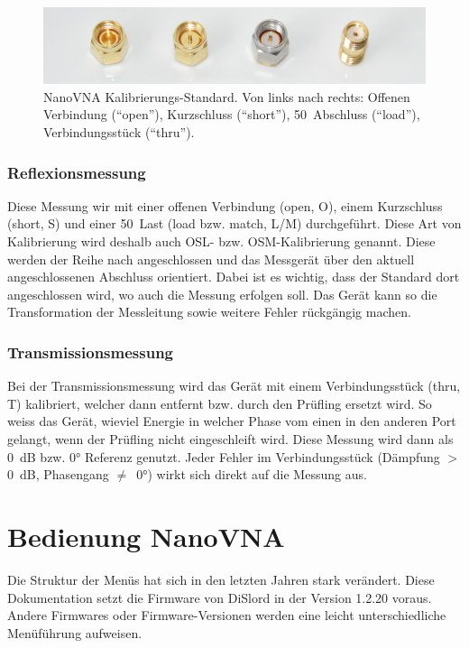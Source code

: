 \documentclass[twoside,a4paper,11pt,halfparskip,DIV=11,notitlepage]{scrartcl}
\begin{document}
\begin{figure}[t]
    \includegraphics[width=\textwidth]{figures/calkit.jpg}
    \caption{NanoVNA Kalibrierungs-Standard. Von links nach rechts:
        Offenen Verbindung (``open''), Kurzschluss (``short''),
    50~\Ohm Abschluss (``load''), Verbindungsstück (``thru'').}
    \label{fig:calkit}
\end{figure}

\subsubsection{Reflexionsmessung}
Diese Messung wir mit einer offenen Verbindung (open, O), einem Kurzschluss
(short, S) und einer 50~\Ohm Last (load bzw. match, L/M) durchgeführt. Diese Art von
Kalibrierung wird deshalb auch OSL- bzw. OSM-Kalibrierung genannt. Diese
werden der Reihe nach angeschlossen und das Messgerät über den aktuell angeschlossenen
Abschluss orientiert. Dabei ist es wichtig, dass der Standard dort angeschlossen
wird, wo auch die Messung erfolgen soll. Das Gerät kann so die Transformation
der Messleitung sowie weitere Fehler rückgängig machen.

\subsubsection{Transmissionsmessung}
Bei der Transmissionsmessung wird das Gerät mit einem Verbindungsstück (thru, T) kalibriert,
welcher dann entfernt bzw. durch den Prüfling ersetzt wird. So weiss das  Gerät,
wieviel Energie in welcher Phase vom einen in den anderen Port gelangt, wenn der
Prüfling nicht eingeschleift wird. Diese Messung wird dann als 0~dB bzw. 0° Referenz
genutzt. Jeder Fehler im Verbindungsstück (Dämpfung $>$ 0~dB, Phasengang $\ne$~0°)
wirkt sich direkt auf die Messung aus.


\newpage %
\section{Bedienung NanoVNA}
Die Struktur der Menüs hat sich in den letzten Jahren stark verändert. Diese Dokumentation
setzt die Firmware von DiSlord in der Version 1.2.20 voraus. Andere Firmwares
oder Firmware-Versionen werden eine leicht unterschiedliche Menüführung aufweisen.
\end{document}
